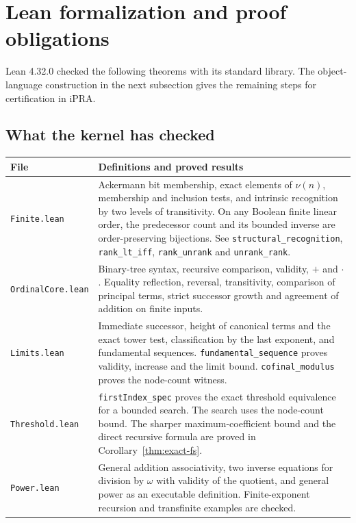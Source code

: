 \section{Lean formalization and proof obligations}
\label{sec:formal}
Lean 4.32.0 checked the following theorems with its standard library. The object-language construction in the next subsection gives the remaining steps for certification in iPRA.

\subsection{What the kernel has checked}
\renewcommand{\arraystretch}{1.15}
\begin{tabularx}{\linewidth}{@{}p{.22\linewidth}X@{}}
\toprule
File & Definitions and proved results\\\midrule
\texttt{Finite.lean} & Ackermann bit membership, exact elements of $\nu(n)$, membership and inclusion tests, and intrinsic recognition by two levels of transitivity. On any Boolean finite linear order, the predecessor count and its bounded inverse are order-preserving bijections. See \texttt{structural\_recognition}, \texttt{rank\_lt\_iff}, \texttt{rank\_unrank} and \texttt{unrank\_rank}.\\
\texttt{OrdinalCore.lean} & Binary-tree syntax, recursive comparison, validity, $+$ and $\cdot$. Equality reflection, reversal, transitivity, comparison of principal terms, strict successor growth and agreement of addition on finite inputs.\\
\texttt{Limits.lean} & Immediate successor, height of canonical terms and the exact tower test, classification by the last exponent, and fundamental sequences. \texttt{fundamental\_sequence} proves validity, increase and the limit bound. \texttt{cofinal\_modulus} proves the node-count witness.\\
\texttt{Threshold.lean} & \texttt{firstIndex\_spec} proves the exact threshold equivalence for a bounded search. The search uses the node-count bound. The sharper maximum-coefficient bound and the direct recursive formula are proved in Corollary~\ref{thm:exact-fs}.\\
\texttt{Power.lean} & General addition associativity, two inverse equations for division by $\omega$ with validity of the quotient, and general power as an executable definition. Finite-exponent recursion and transfinite examples are checked.\\
\bottomrule
\end{tabularx}

